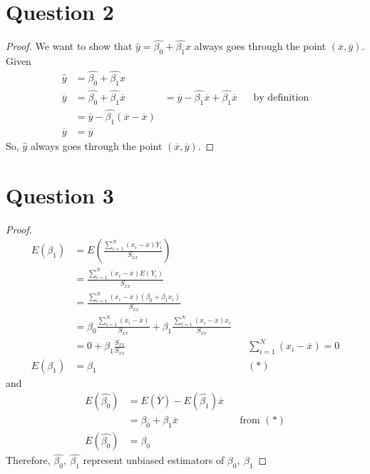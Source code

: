 \documentclass[13pt]{article}
\begin{document}
\newpage
\section*{Question 2}
\begin{proof}
  We want to show that $\hat{y} = \hat{\beta_0} + \hat{\beta_1} x$ always goes through the point
  $(\overline{x}, \overline{y})$. Given
  \begin{align*}
    \hat{y} &= \hat{\beta_0} + \hat{\beta_1} x \\
    \overline{y} &= \hat{\beta_0} + \hat{\beta_1} \overline{x}
                 &= \overline{y} - \hat{\beta_1} \overline{x} + \hat{\beta_1} \overline{x} && \text{by definition} \\
                 &= \overline{y} - \hat{\beta_1} (\overline{x} - \overline{x}) \\
    \overline{y} &= \overline{y}
  \end{align*}
  So, $\hat{y}$ always goes through the point $(\overline{x}, \overline{y})$.
\end{proof}

\newpage
\section*{Question 3}
\begin{proof}
  \begin{align*}
    E(\beta_1) &= E \left( \frac{\sum\limits_{i = 1}^{N} (x_i - \overline{x}) Y_i}
                 {S_{xx}} \right) \\
               &= \frac{\sum\limits_{i = 1}^{N} (x_i - \overline{x}) E(Y_i)}
                 {S_{xx}} \\
               &= \frac{\sum\limits_{i = 1}^{N} (x_i - \overline{x}) (\beta_0 + \beta_1 x_i)}{S_{xx}} \\
               &= \beta_0 \frac{\sum\limits_{i = 1}^{N} (x_i - \overline{x})}{S_{xx}}
                 + \beta_1 \frac{\sum\limits_{i = 1}^{N} (x_i - \overline{x}) x_i}{S_{xx}} \\
               &= 0 + \beta_1 \frac{S_{xx}}{S_{xx}} && \sum\limits_{i = 1}^{N} (x_i - \overline{x}) = 0 \\
    E(\beta_1) &= \beta_1 && (*)
  \end{align*}
  and
  \begin{align*}
    E(\hat{\beta_0}) &= E(\overline{Y}) - E(\hat{\beta_1}) \overline{x} \\
                     &= \beta_0 + \beta_1 \overline{x} && \text{from } (*) \\
    E(\hat{\beta_0}) &= \beta_0
  \end{align*}
  Therefore, $\hat{\beta_0}, \ \hat{\beta_1}$ represent unbiased estimators of $\beta_0, \ \beta_1$
\end{proof}
\end{document}
